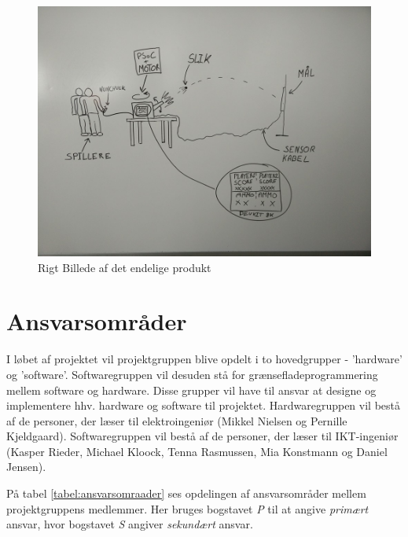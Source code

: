 \begin{figure}[H]
	\centering
	\includegraphics[width=\textwidth]{Projektformulering/images/rigtBillede}
	\caption{Rigt Billede af det endelige produkt}
	\label{ref:RigtBillede}
\end{figure}

\newpage
\section{Ansvarsområder}
I løbet af projektet vil projektgruppen blive opdelt i to hovedgrupper - 'hardware' og 'software'. Softwaregruppen vil desuden stå for grænsefladeprogrammering mellem software og hardware. Disse grupper vil have til ansvar at designe og implementere hhv. hardware og software til projektet. Hardwaregruppen vil bestå af de personer, der læser til elektroingeniør (Mikkel Nielsen og Pernille Kjeldgaard). Softwaregruppen vil bestå af de personer, der læser til IKT-ingeniør (Kasper Rieder, Michael Kloock, Tenna Rasmussen, Mia Konstmann og Daniel Jensen).

På tabel \ref{tabel:ansvarsomraader} ses opdelingen af ansvarsområder mellem projektgruppens medlemmer. Her bruges bogstavet \textit{P} til at angive \textit{primært} ansvar, hvor bogstavet \textit{S} angiver \textit{sekundært} ansvar.

